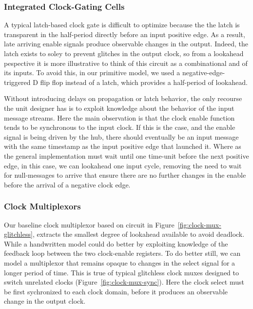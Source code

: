 \subsubsection{Integrated Clock-Gating Cells}
A typical latch-based clock gate is difficult to optimize because the the latch
is transparent in the half-period directly before an input positive edge. As a
result, late arriving enable signals produce observable changes in the output.
Indeed, the latch exists to soley to prevent glitches in the output clock, so
from a lookahead pespective it is more illustrative to think of this circuit as
a combinational and of its inputs.  To avoid this, in our
primitive model, we used a negative-edge-triggered D flip flop instead of a
latch, which provides a half-period of lookahead.

Without introducing delays on propagation or latch behavior, the only recourse
the unit designer has is to exploit knowledge about the behavior of the input
message streams. Here the main observation is that the clock enable function
tends to be synchronous to the input clock.  If this is the case, and the
enable signal is being driven by the hub, there should eventually be an input
message with the same timestamp as the input positive edge that launched it.
Where as the general implementation must wait until one time-unit before the
next positive edge, in this case, we can lookahead one input cycle, removing
the need to wait for null-messages to arrive that ensure there are no further
changes in the enable before the arrival of a negative clock edge.

\subsubsection{Clock Multiplexors}
Our baseline clock multiplexor based on circuit in
Figure~\ref{fig:clock-mux-glitchless}, extracts the smallest degree of
lookahead available to avoid deadlock. While a handwritten model could do
better by exploiting knowledge of the feedback loop between the two
clock-enable registers. To do better still, we can model a multiplexor that
remains opaque to changes in the select signal for a longer period of time.
This is true of typical glitchless clock muxes designed to switch
unrelated clocks (Figure~\ref{fig:clock-mux-sync}). Here the clock select must be first sychronized
to each clock domain, before it produces an observable change in the output
clock.

